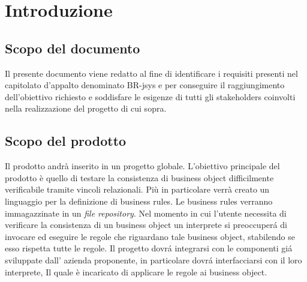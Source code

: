 \documentclass[11pt,titlepage,a4paper]{report}
\begin{document}
\chapter{Introduzione}
\section{Scopo del documento}
Il presente documento viene redatto al fine di identificare i requisiti presenti nel capitolato d'appalto denominato BR-jsys e per conseguire il raggiungimento dell'obiettivo richiesto e soddisfare le esigenze di tutti gli stakeholders coinvolti nella realizzazione del progetto di cui sopra.
\section{Scopo del prodotto}
Il prodotto andr\`a inserito in un progetto globale. L'obiettivo principale del prodotto \`e quello di testare la consistenza di business object difficilmente verificabile tramite vincoli relazionali.
Pi\`u in particolare verr\`a creato un linguaggio per la definizione di business rules.  Le business rules verranno immagazzinate in un \textit{file repository}. Nel momento in cui l'utente necessita di verificare la consistenza di un business object un interprete si preoccuper\'a di invocare ed eseguire le regole che riguardano tale business object, stabilendo se esso rispetta tutte le regole.
Il progetto dovr\'a integrarsi con le componenti gi\'a sviluppate dall' azienda proponente, in particolare dovr\'a interfacciarsi con il loro interprete, Il quale \`e incaricato di applicare le regole ai business object.
\end{document}
